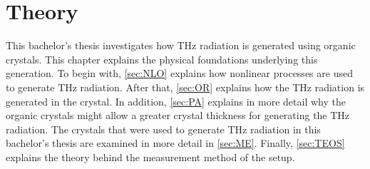 \chapter{Theory}
\label{sec:Theo}
This bachelor's thesis investigates how THz radiation is generated using organic crystals.
This chapter explains the physical foundations underlying this generation.
To begin with, \autoref{sec:NLO}
explains how nonlinear processes are used to generate THz radiation.
After that, \autoref{sec:OR} explains how the THz radiation is generated in the crystal.
In addition, \autoref{sec:PA} explains in more detail why the organic crystals might allow a
greater crystal thickness for generating the THz radiation.
The crystals that were used to generate THz radiation in this bachelor's thesis
are examined in more detail in \autoref{sec:ME}.
Finally, \autoref{sec:TEOS} explains the theory behind the measurement method of the setup.


